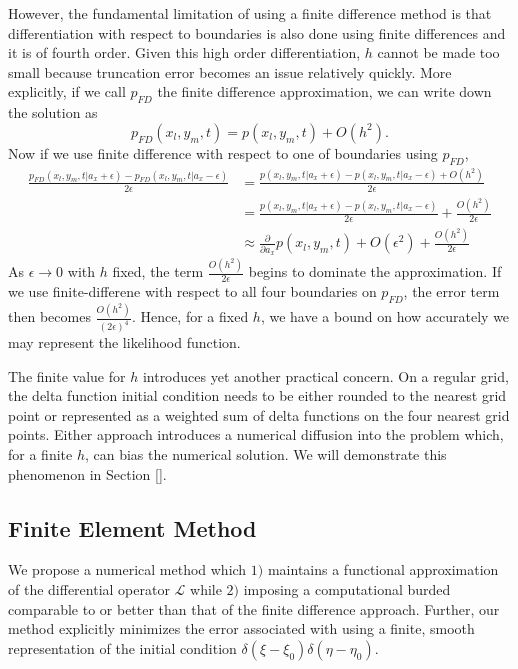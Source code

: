 \documentclass[10pt]{article}
\begin{document}
However, the fundamental limitation of using a finite difference
method is that differentiation with respect to boundaries is also done
using finite differences and it is of fourth order. Given this high
order differentiation, $h$ cannot be made too small because truncation
error becomes an issue relatively quickly. More explicitly, if we call
$p_{FD}$ the finite difference approximation, we can write down the
solution as
\[
  p_{FD}(x_l,y_m,t) = p(x_l,y_m,t) + O(h^2).
\]
Now if we use finite difference with respect to one of boundaries
using $p_{FD}$,
\begin{align*}
  \frac{p_{FD}(x_l,y_m,t | a_x + \epsilon) - p_{FD}(x_l,y_m,t | a_x - \epsilon)}{2\epsilon} &= \frac{p(x_l,y_m,t | a_x + \epsilon) - p(x_l,y_m,t | a_x - \epsilon) + O(h^2)}{2\epsilon} \\
                                                                                            &= \frac{p(x_l,y_m,t | a_x + \epsilon) - p(x_l,y_m,t | a_x - \epsilon)}{2\epsilon} + \frac{O(h^2)}{2\epsilon} \\
                                                                                            &\approx \frac{\partial}{\partial a_x} p(x_l,y_m,t) + O(\epsilon^2) + \frac{O(h^2)}{2\epsilon}
\end{align*}
As $\epsilon \to 0$ with $h$ fixed, the term
$\frac{O(h^2)}{2\epsilon}$ begins to dominate the approximation. If we
use finite-differene with respect to all four boundaries on $p_{FD}$,
the error term then becomes $\frac{O(h^2)}{(2\epsilon)^4}$. Hence, for
a fixed $h$, we have a bound on how accurately we may represent the
likelihood function.

The finite value for $h$ introduces yet another practical concern. On
a regular grid, the delta function initial condition needs to be
either rounded to the nearest grid point or represented as a weighted
sum of delta functions on the four nearest grid points. Either
approach introduces a numerical diffusion into the problem which, for
a finite $h$, can bias the numerical solution. We will demonstrate
this phenomenon in Section [].

\subsection{Finite Element Method}
We propose a numerical method which $1)$ maintains a functional
approximation of the differential operator $\mathcal{L}$ while $2)$
imposing a computational burded comparable to or better than that of
the finite difference approach. Further, our method explicitly minimizes
the error associated with using a finite, smooth representation of the
initial condition $\delta(\xi-\xi_0)\delta(\eta-\eta_0)$.
\end{document}
